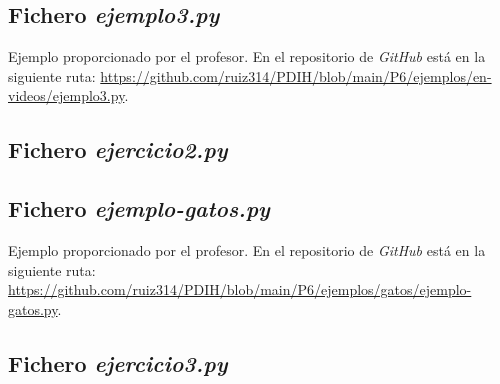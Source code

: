 \documentclass[a4paper]{article}
\begin{document}
\subsection{Fichero \textit{ejemplo3.py}} \label{anexo:ejemplo3} 
Ejemplo proporcionado por el profesor. En el repositorio de \textit{GitHub} está en la siguiente ruta: \url{https://github.com/ruiz314/PDIH/blob/main/P6/ejemplos/en-videos/ejemplo3.py}.


\subsection{Fichero \textit{ejercicio2.py}} \label{anexo:ejer2} 



\subsection{Fichero \textit{ejemplo-gatos.py}} \label{anexo:ejemploGatos} 
Ejemplo proporcionado por el profesor. En el repositorio de \textit{GitHub} está en la siguiente ruta: \url{https://github.com/ruiz314/PDIH/blob/main/P6/ejemplos/gatos/ejemplo-gatos.py}.


\subsection{Fichero \textit{ejercicio3.py}} \label{anexo:ejer3} 


\end{document}
